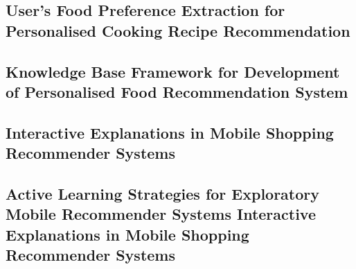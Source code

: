 \subsection{User's Food Preference Extraction for Personalised Cooking Recipe Recommendation}

\subsection{Knowledge Base Framework for Development of Personalised Food Recommendation System}

\subsection{Interactive Explanations in Mobile Shopping Recommender Systems}

\subsection{Active Learning Strategies for Exploratory Mobile Recommender Systems Interactive Explanations in Mobile Shopping Recommender Systems}